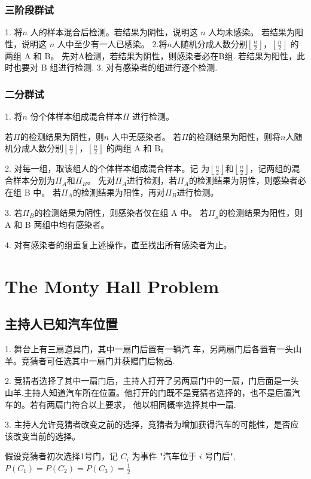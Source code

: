 \documentclass[10t, a4paper, oneside]{ctexbook}
\begin{document}
\subsubsection{三阶段群试}
1. 将$n$ 人的样本混合后检测。若结果为阴性，说明这 $n$ 人均未感染。
若结果为阳性，说明这 $n$ 人中至少有一人已感染。
2.将$n$人随机分成人数分别$\left\lfloor\frac n2\right\rfloor$，$\left\lfloor\frac n2\right\rfloor$
的两组 A 和 B。
先对A检测，若结果为阴性，则感染者必在B组.
若结果为阳性，此时也要对 B 组进行检测.
3. 对有感染者的组进行逐个检测.

\subsubsection{二分群试}

1. 将$n$ 份个体样本组成混合样本$\Pi$ 进行检测。

若$\Pi$的检测结果为阴性，则$n$ 人中无感染者。
若$\Pi$的检测结果为阳性，则将$n$人随机分成人数分别$\left\lfloor\frac n2\right\rfloor$，$\left\lfloor\frac n2\right\rfloor$
的两组 A 和 B。

2. 对每一组，取该组人的个体样本组成混合样本。记 为$\left\lfloor\frac n2\right\rfloor$和$\left\lfloor\frac n2\right\rfloor$，记两组的混合样本分别为$\Pi_{A}$和$\Pi_{B}$。
先对$\Pi_{A}$进行检测，若$\Pi_{A}$的检测结果为阴性，则感染者必在组 B 中。
若$\Pi_{A}$的检测结果为阳性，再对$\Pi_{B}$进行检测。

3. 若$\Pi_{B}$的检测结果为阴性，则感染者仅在组 A 中。
若$\Pi_{_{B}}$的检测结果为阳性，则 A 和 B 两组中均有感染者。

4. 对有感染者的组重复上述操作，直至找出所有感染者为止。
\section{The Monty Hall Problem}
\subsection{主持人已知汽车位置}
1. 舞台上有三扇道具门，其中一扇门后置有一辆汽 车，另两扇门后各置有一头山羊。竞猜者可任选其中一扇门并获赠门后物品.

2. 竞猜者选择了其中一扇门后，主持人打开了另两扇门中的一扇，门后面是一头山羊.主持人知道汽车所在位置。他打开的门既不是竞猜者选择的，也不是后置汽车的。若有两扇门符合以上要求， 他以相同概率选择其中一扇.

3. 主持人允许竞猜者改变之前的选择，竞猜者为增加获得汽车的可能性，是否应该改变当前的选择。

假设竞猜者初次选择1号门，记 $C_i$ 为事件 "汽车位于 $i$ 号门后",$P(C_1)=P(C_2)=P(C_3)=\frac12$
\end{document}
